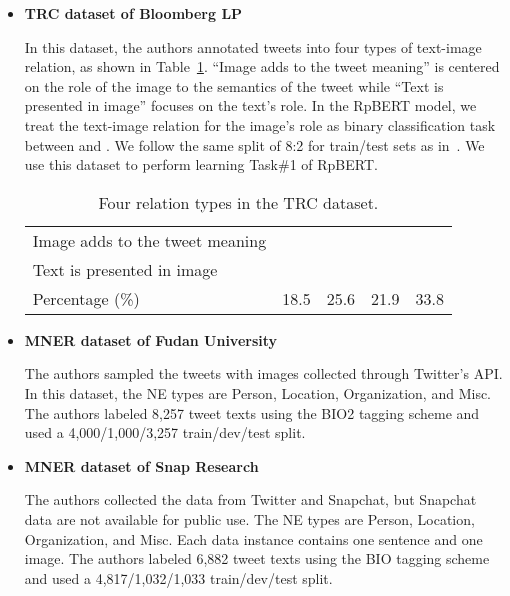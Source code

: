 \documentclass[letterpaper]{article} \usepackage{aaai21}  \usepackage{times}  \usepackage{helvet} \usepackage{courier}  \usepackage[hyphens]{url}  \usepackage{graphicx} \urlstyle{rm} \def\UrlFont{\rm}  \usepackage{natbib}  \usepackage{caption} \frenchspacing  \setlength{\pdfpagewidth}{8.5in}  \setlength{\pdfpageheight}{11in}
\begin{document}
\begin{itemize}




\item \textbf{TRC dataset of Bloomberg LP~\cite{vempala2019categorizing}}

In this dataset, the authors annotated tweets into four types of text-image relation, as shown in Table~\ref{tab:bloomberg}.
``Image adds to the tweet meaning'' is centered on the role of the image to the semantics of the tweet while ``Text is presented in image'' focuses on the text’s role.
In the RpBERT model, we treat the  text-image relation for the image’s role as binary classification task between  and .
We follow the same split of 8:2 for train/test sets as in~\cite{vempala2019categorizing}.
We use this dataset to perform learning Task\#1  of  RpBERT.



\begin{table}[htb]
\small
\centering
\begin{tabular}{|l|cccc|} 
  \hline
&  &    & & 		\\
\hline


				Image adds to the tweet meaning				&  &  & & \\
					Text is presented in image			&   &   &  & \\
					 Percentage (\%) 			& 18.5  &  25.6& 21.9 & 33.8\\
\hline
\end{tabular}
\caption{Four relation types  in the TRC dataset.}\label{tab:bloomberg}
\end{table}


\item \textbf{MNER dataset of Fudan University~\cite{zhang2018adaptive} }

The authors sampled the tweets with images collected through Twitter’s API.
In this dataset, the NE types are Person, Location, Organization, and Misc.
The authors labeled 8,257 tweet texts using the BIO2 tagging scheme and used a 4,000/1,000/3,257 train/dev/test split.

\item \textbf{MNER  dataset of Snap Research~\cite{lu2018visual}}

The authors collected the data from Twitter and Snapchat, but Snapchat data are not available for public use.
The NE types are Person, Location, Organization, and Misc.
Each data instance contains one sentence and one image.
The authors labeled 6,882 tweet texts using the BIO tagging scheme and used a 4,817/1,032/1,033 train/dev/test split.

\end{itemize}
\end{document}
